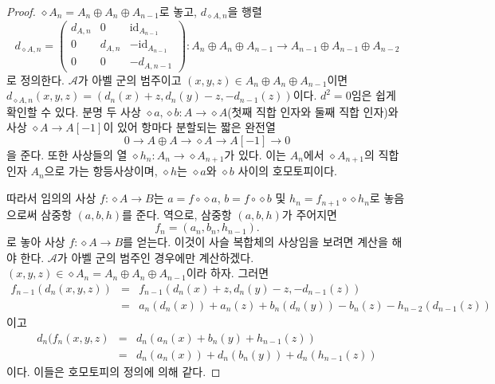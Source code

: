 \begin{proof}
$\diamond A_n = A_n \oplus A_n \oplus A_{n - 1}$로 놓고,
$d_{\diamond A, n}$을 행렬
$$
d_{\diamond A, n}
=
\left(
\begin{matrix}
d_{A, n} & 0 & \text{id}_{A_{n - 1}} \\
0 & d_{A, n} & -\text{id}_{A_{n - 1}} \\
0 & 0 & -d_{A, n - 1}
\end{matrix}
\right) :
A_n \oplus A_n \oplus A_{n - 1} \to
A_{n - 1} \oplus A_{n - 1} \oplus A_{n - 2}
$$
로 정의한다. $\mathcal{A}$가 아벨 군의 범주이고
$(x, y, z) \in A_n \oplus A_n \oplus A_{n - 1}$이면
$d_{\diamond A, n}(x, y, z) = (d_n(x) + z, d_n(y) - z, -d_{n - 1}(z))$이다.
$d^2 = 0$임은 쉽게 확인할 수 있다. 분명 두 사상
$\diamond a, \diamond b : A \to \diamond A$(첫째 직합 인자와 둘째 직합
인자)와 사상 $\diamond A \to A[-1]$이 있어 항마다 분할되는 짧은 완전열
$$
0 \to
A \oplus A \to
\diamond A \to
A[-1] \to
0
$$
을 준다. 또한 사상들의 열 $\diamond h_n : A_n \to \diamond A_{n + 1}$가
있다. 이는 $A_n$에서 $\diamond A_{n + 1}$의 직합 인자 $A_n$으로 가는
항등사상이며, $\diamond h$는 $\diamond a$와 $\diamond b$ 사이의
호모토피이다.

\medskip\noindent
따라서 임의의 사상 $f : \diamond A \to B$는
$a = f \circ \diamond a$, $b = f \circ \diamond b$ 및
$h_n = f_{n + 1} \circ \diamond h_n$로 놓음으로써 삼중항 $(a, b, h)$를
준다. 역으로, 삼중항 $(a, b, h)$가 주어지면
$$
f_n = (a_n, b_n, h_{n - 1}).
$$
로 놓아 사상 $f : \diamond A \to B$를 얻는다. 이것이 사슬 복합체의
사상임을 보려면 계산을 해야 한다. $\mathcal{A}$가 아벨 군의 범주인
경우에만 계산하겠다.
$(x, y, z) \in \diamond A_n = A_n \oplus A_n \oplus A_{n - 1}$이라 하자.
그러면
\begin{eqnarray*}
f_{n - 1}(d_n(x, y, z)) & = &
f_{n - 1}(d_n(x) + z, d_n(y) - z, -d_{n - 1}(z)) \\
& = &
a_n(d_n(x)) + a_n(z) + b_n(d_n(y)) - b_n(z) - h_{n - 2}(d_{n - 1}(z))
\end{eqnarray*}
이고
\begin{eqnarray*}
d_n(f_n(x, y, z) & = &
d_n(a_n(x) + b_n(y) + h_{n - 1}(z)) \\
& = &
d_n(a_n(x)) + d_n(b_n(y)) + d_n(h_{n - 1}(z))
\end{eqnarray*}
이다. 이들은 호모토피의 정의에 의해 같다.
\end{proof}

